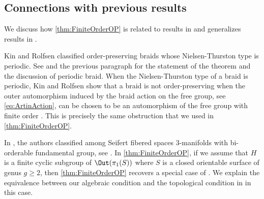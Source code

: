 \documentclass{amsart}
\begin{document}
\subsection{Connections with previous results}
We discuss how \cref{thm:FiniteOrderOP} is related to results in \cite{BoyerRolfsenWiest05} and generalizes results in \cite{KinRolfsen18}. 

Kin and Rolfsen \cite{KinRolfsen18} classified order-preserving braids whose Nielsen-Thurston type is periodic. See \cite[Theorem 4.10]{KinRolfsen18} and the previous paragraph for the statement of the theorem and the discussion of periodic braid. When the Nielsen-Thurston type of a braid is periodic, Kin and Rolfsen show that a braid is not order-preserving when the outer automorphism induced by the braid action on the free group, see \cref{eq:ArtinAction}, can be chosen to be an automorphism of the free group with finite order \cite[Equation 4.2]{KinRolfsen18}. This is precisely the same obstruction that we used in \cref{thm:FiniteOrderOP}.          

In \cite{BoyerRolfsenWiest05}, the authors classified among Seifert fibered spaces 3-manifolds with bi-orderable fundamental group, see \cite[Theorem 1.5]{BoyerRolfsenWiest05}. In \cref{thm:FiniteOrderOP}, if we assume that $H$ is a finite cyclic subgroup of $\Out(\pi_1(S))$ where $S$ is a closed orientable surface of genus $g \geq 2$, then \cref{thm:FiniteOrderOP} recovers a special case of \cite[Theorem 1.5]{BoyerRolfsenWiest05}. We explain the equivalence between our algebraic condition and the topological condition in \cite[Theorem 1.5]{BoyerRolfsenWiest05} in this case.
\end{document}
